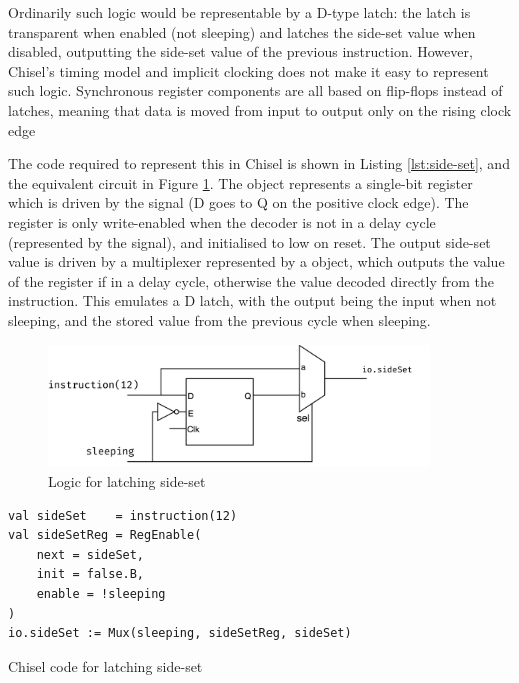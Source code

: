 Ordinarily such logic would be representable by a D-type latch: the latch is transparent when enabled (not sleeping) and latches the side-set value when disabled, outputting the side-set value of the previous instruction. However, Chisel's timing model and implicit clocking does not make it easy to represent such logic. Synchronous register components are all based on flip-flops instead of latches, meaning that data is moved from input to output only on the rising clock edge

The code required to represent this in Chisel is shown in Listing \ref{lst:side-set}, and the equivalent circuit in Figure \ref{fig:side-set}. The  object represents a single-bit register which is driven by the  signal (D goes to Q on the positive clock edge). The register is only write-enabled when the decoder is not in a delay cycle (represented by the  signal), and initialised to low on reset. The output side-set value  is driven by a multiplexer represented by a  object, which outputs the value of the register if in a delay cycle, otherwise the value decoded directly from the instruction. This emulates a D latch, with the output being the input when not sleeping, and the stored value from the previous cycle when sleeping.

\begin{figure}[H]
    \centering
    \includegraphics[width=0.9\textwidth]{../img/side-set.png}
    \caption{Logic for latching side-set}
    \label{fig:side-set}
\end{figure}

\begin{listing}[h!]
    \vspace{0.5cm}
    \begin{verbatim}
val sideSet    = instruction(12)
val sideSetReg = RegEnable(
    next = sideSet, 
    init = false.B, 
    enable = !sleeping
)
io.sideSet := Mux(sleeping, sideSetReg, sideSet)
    \end{verbatim}
    \caption{Chisel code for latching side-set}
    \label{lst:side-set}
\end{listing}

